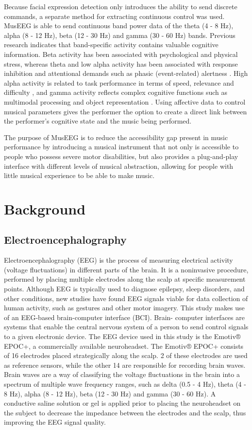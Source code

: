 Because facial expression detection only introduces the ability to send discrete commands, a separate method for extracting continuous control was used. MusEEG is able to send continuous band power data of the theta (4 - 8 Hz),  alpha (8 - 12 Hz), beta (12 - 30 Hz) and gamma (30 - 60 Hz) bands. Previous research indicates that band-specific activity contains valuable cognitive information. Beta activity has been associated with psychological and physical stress, whereas theta and low alpha activity has been associated with response inhibition and attentional demands such as phasic (event-related) alertness \cite{alphabeta, overallbandpaper}. High alpha activity is related to task performance in terms of speed, relevance and difficulty \cite{alphatheta}, and gamma activity reflects complex cognitive functions such as multimodal processing and object representation \cite{gamma}. Using affective data to control musical parameters gives the performer the option to create a direct link between the performer’s cognitive state and the music being performed.

The purpose of MusEEG is to reduce the accessibility gap present in music performance by introducing a musical instrument that not only is accessible to people who possess severe motor disabilities, but also provides a plug-and-play interface with different levels of musical abstraction, allowing for people with little musical experience to be able to make music. 

\pagebreak

\section{Background}
\subsection{Electroencephalography}
Electroencephalography (EEG) is the process of measuring electrical activity (voltage
fluctuations) in different parts of the brain. It is a noninvasive procedure, performed by placing
multiple electrodes along the scalp at specific measurement points. Although EEG is typically
used to diagnose epilepsy, sleep disorders, and other conditions, new studies have found EEG
signals viable for data collection of human activity, such as gestures and other motor imagery.
This study makes use of an EEG-based brain-computer interface (BCI). Brain-
computer interfaces are systems that enable the central nervous system of a person to send
control signals to a given electronic device. The EEG device used in this study is
the Emotiv® EPOC+, a commercially available neuroheadset. The Emotiv® EPOC+ consists of 16
electrodes placed strategically along the scalp. 2 of these electrodes are used as reference
sensors, while the other 14 are responsible for recording brain waves. Brain waves are a way of
classifying the voltage fluctuations in the brain into a spectrum of multiple wave frequency
ranges, such as delta (0.5 - 4 Hz), theta (4 - 8 Hz), alpha (8 - 12 Hz), beta (12 - 30 Hz) and
gamma (30 - 60 Hz). A conductive saline solution or gel is applied prior to placing the
neuroheadset on the subject to decrease the impedance between the electrodes and the scalp, thus improving the EEG signal quality.


